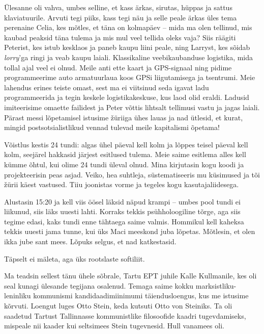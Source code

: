 
Ülesanne oli vahva, umbes selline, et kass ärkas, sirutas, hüppas ja sattus klaviatuurile. Arvuti tegi 
piiks, kass tegi näu ja selle peale ärkas üles tema perenaine Celia, kes 
mõtles, et täna on kolmapäev -- mida ma olen tellinud, mis kaubad peaksid täna 
tulema ja mis mul veel tellida oleks vaja? Siis räägiti Peterist, kes istub 
kesklaos ja paneb kaupu liini peale, ning Larryst, kes sõidab 
\emph{lorry}'ga ringi ja veab kaupu laiali. Klassikaline 
veebikaubanduse logistika, mida tollal ajal veel ei olnud. Meile anti 
ette kaart ja GPS-signaal ning pidime programmeerime auto armatuurlaua 
koos GPSi liigutamisega ja tsentrumi. Meie lahendus erines teiste omast, sest ma ei 
viitsinud seda igavat ladu programmeerida ja tegin keskele 
logistikakeskuse, kus laod olid eraldi. Ladusid imiteerisime omaette failidest 
ja Peter võttis lihtsalt tellimusi vastu ja jagas laiali. 
Pärast messi lõpetamisel istusime žüriiga ühes lauas ja nad ütlesid, et kurat, mingid postsotsialistlikud vennad tulevad meile kapitalismi 
õpetama! 

Võistlus kestis 24 tundi: algas ühel päeval kell kolm ja lõppes teisel päeval 
kell kolm, seejärel hakkasid järjest esitlused tulema. Meie saime esitlema 
alles kell kümme õhtul, kui olime 24 tundi üleval olnud. Mina kirjutasin kogu koodi ja 
projekteerisin peas asjad. Veiko, hea suhtleja, süstematiseeris mu küsimused ja tõi 
žürii käest vastused. Tiiu joonistas vorme ja tegeles kogu kasutajaliidesega. 

Alustasin 15:20 ja kell viis öösel läksid näpud krampi -- umbes pool tundi 
ei liikunud, siis läks uuesti lahti. Korraks tekkis psühholoogiline tõrge, aga siis tegime edasi, kaks tundi enne tähtaega saime 
valmis. Hommikul kell kaheksa tekkis uuesti jama tunne, kui üks
Maci meeskond juba lõpetas. Mõtlesin, et olen ikka jube sant mees. Lõpuks 
selgus, et nad katkestasid.


Täpselt ei mäleta, aga üks rootslaste softiliit. 

Ma teadsin sellest tänu ühele sõbrale, Tartu EPT juhile Kalle Kullmanile, kes oli seal kunagi ülesande tegijana osalenud. Temaga saime 
kokku marksistliku-leninliku kommunismi kandidaadimiinimumi täiendusloengus, kus me istusime kõrvuti. Loengut 
luges Otto Stein, keda kutsuti Otto 
von Steiniks. Ta oli saadetud Tartust Tallinnasse kommunistlike filosoofide 
kaadri tugevdamiseks, mispeale nii kaader kui seltsimees Stein tugevnesid. Hull vanamees oli.

